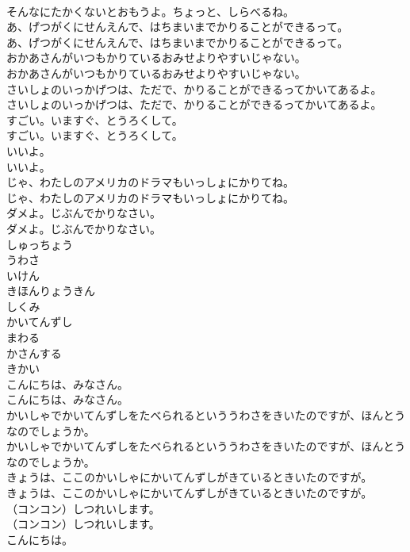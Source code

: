 \documentclass[8pt]{extreport}
\begin{document}
\begin{CJK}{UTF8}{min}
\\	そんなにたかくないとおもうよ。ちょっと、しらべるね。
\\	あ、げつがくにせんえんで、はちまいまでかりることができるって。
\\	あ、げつがくにせんえんで、はちまいまでかりることができるって。
\\	おかあさんがいつもかりているおみせよりやすいじゃない。
\\	おかあさんがいつもかりているおみせよりやすいじゃない。
\\	さいしょのいっかげつは、ただで、かりることができるってかいてあるよ。
\\	さいしょのいっかげつは、ただで、かりることができるってかいてあるよ。
\\	すごい。いますぐ、とうろくして。
\\	すごい。いますぐ、とうろくして。
\\	いいよ。
\\	いいよ。
\\	じゃ、わたしのアメリカのドラマもいっしょにかりてね。
\\	じゃ、わたしのアメリカのドラマもいっしょにかりてね。
\\	ダメよ。じぶんでかりなさい。
\\	ダメよ。じぶんでかりなさい。
\\	しゅっちょう
\\	うわさ
\\	いけん
\\	きほんりょうきん
\\	しくみ
\\	かいてんずし
\\	まわる
\\	かさんする
\\	きかい
\\	こんにちは、みなさん。
\\	こんにちは、みなさん。
\\	かいしゃでかいてんずしをたべられるといううわさをきいたのですが、ほんとうなのでしょうか。
\\	かいしゃでかいてんずしをたべられるといううわさをきいたのですが、ほんとうなのでしょうか。
\\	きょうは、ここのかいしゃにかいてんずしがきているときいたのですが。
\\	きょうは、ここのかいしゃにかいてんずしがきているときいたのですが。
\\	（コンコン）しつれいします。
\\	（コンコン）しつれいします。
\\	こんにちは。

\end{CJK}
\end{document}
